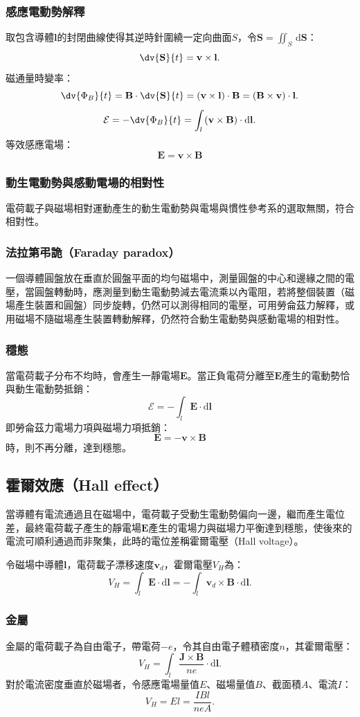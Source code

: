 \documentclass[a4paper,12pt]{report}
\begin{document}
\begin{itemize}
\subsubsection{感應電動勢解釋}
取包含導體$\mathbf{l}$的封閉曲線使得其逆時針圍繞一定向曲面$S$，令$\mathbf{S}=\iint_S\,\mathrm{d}\mathbf{S}$：
\[\dv{\mathbf{S}}{t}=\mathbf{v}\times\mathbf{l}.\]
磁通量時變率：
\[\dv{\Phi_B}{t}=\mathbf{B}\cdot\dv{\mathbf{S}}{t}=(\mathbf{v}\times\mathbf{l})\cdot\mathbf{B}=(\mathbf{B}\times\mathbf{v})\cdot\mathbf{l}.\]
\[\mathcal{E}=-\dv{\Phi_B}{t}=\int_{l}\left(\mathbf{v}\times\mathbf{B}\right)\cdot\mathrm{d}\mathbf{l}.\]
等效感應電場：
\[\mathbf{E}=\mathbf{v}\times\mathbf{B}\]
\subsubsection{動生電動勢與感動電場的相對性}
電荷載子與磁場相對運動產生的動生電動勢與電場與慣性參考系的選取無關，符合相對性。
\subsubsection{法拉第弔詭（Faraday paradox）}
一個導體圓盤放在垂直於圓盤平面的均勻磁場中，測量圓盤的中心和邊緣之間的電壓，當圓盤轉動時，應測量到動生電動勢減去電流乘以內電阻，若將整個裝置（磁場產生裝置和圓盤）同步旋轉，仍然可以測得相同的電壓，可用勞侖茲力解釋，或用磁場不隨磁場產生裝置轉動解釋，仍然符合動生電動勢與感動電場的相對性。
\subsubsection{穩態}
當電荷載子分布不均時，會產生一靜電場$\mathbf{E}$。當正負電荷分離至$\mathbf{E}$產生的電動勢恰與動生電動勢抵銷：
\[\mathcal{E}=-\int_l\mathbf{E}\cdot\mathrm{d}\mathbf{l}\]
即勞侖茲力電場力項與磁場力項抵銷：
\[\mathbf{E}=-\mathbf{v}\times\mathbf{B}\]
時，則不再分離，達到穩態。
\subsection{霍爾效應（Hall effect）}
當導體有電流通過且在磁場中，電荷載子受動生電動勢偏向一邊，繼而產生電位差，最終電荷載子產生的靜電場$\mathbf{E}$產生的電場力與磁場力平衡達到穩態，使後來的電流可順利通過而非聚集，此時的電位差稱霍爾電壓（Hall voltage）。

令磁場中導體$\mathbf{l}$，電荷載子漂移速度$\mathbf{v}_d$，霍爾電壓$V_H$為：
\[V_H=\int_{l}\mathbf{E}\cdot\mathrm{d}\mathbf{l}=-\int_{l}\mathbf{v}_d\times\mathbf{B}\cdot\mathrm{d}\mathbf{l}.\]
\subsubsection{金屬}
金屬的電荷載子為自由電子，帶電荷$-e$，令其自由電子體積密度$n$，其霍爾電壓：
\[V_H=\int_{l}\frac{\mathbf{J}\times\mathbf{B}}{ne}\cdot\mathrm{d}\mathbf{l}.\]
對於電流密度垂直於磁場者，令感應電場量值$E$、磁場量值$B$、截面積$A$、電流$I$：
\[V_H=E l=\frac{IB l}{neA}.\]

\end{itemize}
\end{document}
